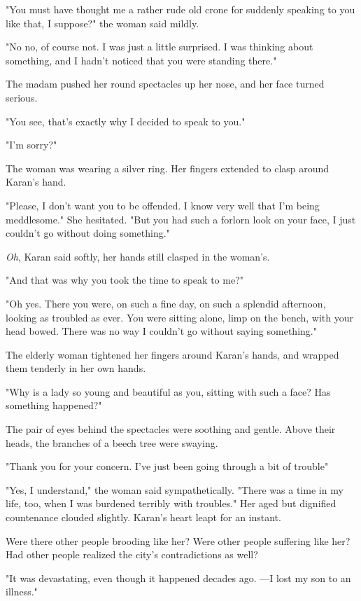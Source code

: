 "You must have thought me a rather rude old crone for suddenly speaking
to you like that, I suppose?" the woman said mildly.

"No no, of course not. I was just a little surprised. I was thinking
about something, and I hadn't noticed that you were standing there."

The madam pushed her round spectacles up her nose, and her face turned
serious.

"You see, that's exactly why I decided to speak to you."

"I'm sorry?"

The woman was wearing a silver ring. Her fingers extended to clasp
around Karan's hand.

"Please, I don't want you to be offended. I know very well that I'm
being meddlesome." She hesitated. "But you had such a forlorn look on
your face, I just couldn't go without doing something."

\emph{Oh}, Karan said softly, her hands still clasped in the woman's.

"And that was why you took the time to speak to me?"

"Oh yes. There you were, on such a fine day, on such a splendid
afternoon, looking as troubled as ever. You were sitting alone, limp on
the bench, with your head bowed. There was no way I couldn't go without
saying something."

The elderly woman tightened her fingers around Karan's hands, and
wrapped them tenderly in her own hands.

"Why is a lady so young and beautiful as you, sitting with such a face?
Has something happened?"

The pair of eyes behind the spectacles were soothing and gentle. Above
their heads, the branches of a beech tree were swaying.

"Thank you for your concern. I've just been going through a bit of
trouble\el "

"Yes, I understand," the woman said sympathetically. "There was a time
in my life, too, when I was burdened terribly with troubles." Her aged
but dignified countenance clouded slightly. Karan's heart leapt for an
instant.

Were there other people brooding like her? Were other people suffering
like her? Had other people realized the city's contradictions as well?

"It was devastating, even though it happened decades ago. ---I lost my son
to an illness."

